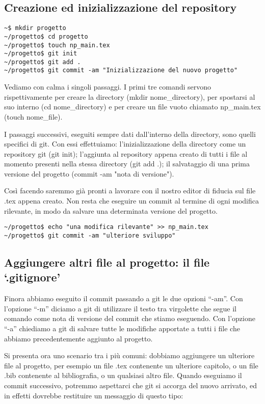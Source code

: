 \documentclass[a4paper,12pt,oneside]{article}
\begin{document}
\subsection{Creazione ed inizializzazione del repository}
\begin{lstlisting}
~$ mkdir progetto
~/progetto$ cd progetto
~/progetto$ touch np_main.tex
~/progetto$ git init
~/progetto$ git add .
~/progetto$ git commit -am "Inizializzazione del nuovo progetto"
\end{lstlisting}

Vediamo con calma i singoli passaggi. I primi tre comandi servono
rispettivamente per creare la directory (mkdir nome\_directory), per spostarsi
al suo interno (cd nome\_directory) e per creare un file vuoto chiamato
np\_main.tex (touch nome\_file).

I passaggi successivi, eseguiti sempre dati dall'interno della directory, sono
quelli specifici di git. Con essi effettuiamo:
l'inizializzazione della directory come un repository git (git init); l'aggiunta
al repository appena creato di tutti i file al momento presenti nella stessa
directory (git add .); il salvataggio di una prima versione del progetto (commit
-am "nota di versione").

Così facendo saremmo già pronti a lavorare con il nostro editor di fiducia sul
file .tex appena creato.
Non resta che eseguire un commit al termine di ogni modifica rilevante, in
modo da salvare una determinata versione del progetto.

\begin{lstlisting}
~/progetto$ echo "una modifica rilevante" >> np_main.tex
~/progetto$ git commit -am "ulteriore sviluppo"
\end{lstlisting}

\subsection{Aggiungere altri file al progetto: il file `.gitignore'}
Finora abbiamo eseguito il commit passando a git le due opzioni ``-am''. Con
l'opzione ``-m'' diciamo a git di utilizzare il testo tra virgolette che segue
il comando come nota di versione del commit che stiamo eseguendo. Con l'opzione
``-a'' chiediamo a git di salvare tutte le modifiche apportate a tutti i file
che abbiamo precedentemente aggiunto al progetto.

Si presenta ora uno scenario tra i più comuni: dobbiamo aggiungere un ulteriore
file al progetto, per esempio un file .tex contenente un ulteriore capitolo, o
un file .bib contenente al bibliografia, o un qualsiasi altro file.
Quando eseguiamo il commit successivo, potremmo aspettarci che git si accorga
del nuovo arrivato, ed in effetti dovrebbe restituire un messaggio di questo
tipo:
\end{document}

